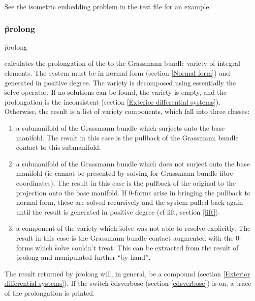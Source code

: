 See the isometric embedding problem in the test file for an example.

\subsubsection{\f{prolong}}
\label{prolong}

\hypertarget{operator:PROLONG}{}
\begin{syntax}
	\f{prolong} 
\end{syntax}
calculates the prolongation of the  to the Grassmann bundle
variety of integral elements. The system must be in normal form (section
\ref{Normal form}) and generated in positive degree. The variety is
decomposed using essentially the \REDUCE \f{solve} operator. If no solutions
can be found, the variety is empty, and the prolongation is the
inconsistent  (section \ref{Exterior differential
systems}). Otherwise, the result is a list of variety components, which
fall into three classes:
\begin{enumerate}
\item a submanifold of the Grassmann bundle which surjects onto the base
      manifold. The result in this case is the pullback of the Grassmann
      bundle contact  to this submanifold.
\item a submanifold of the Grassmann bundle which does not surject onto the
      base manifold (ie cannot be presented by solving for Grassmann
      bundle fibre coordinates). The result in this case is the pullback of
      the original  to the projection onto the base manifold. If
      0-forms arise in bringing the pullback to normal form, these are
      solved recursively and the system pulled back again until the result
      is generated in positive degree (cf \f{lift}, section \ref{lift}).
\item a component of the variety which \f{solve} was not able to resolve
      explicitly. The result in this case is the Grassmann bundle contact
       augmented with the 0-forms which \f{solve} couldn't
      treat. This can be extracted from the result of \f{prolong} and
      manipulated further ``by hand'',
\end{enumerate}
The result returned by \f{prolong} will, in general, be a compound
 (section \ref{Exterior differential systems}). If the switch
\f{edsverbose} (section \ref{edsverbose}) is on, a trace of the
prolongation is printed.

